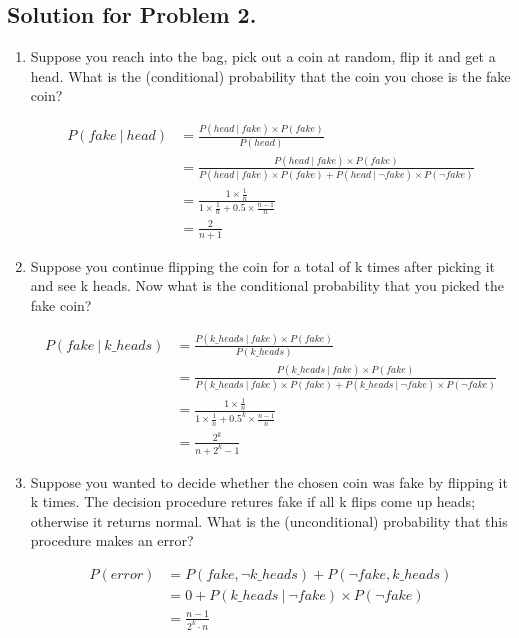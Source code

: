 \documentclass[notitlepage]{article}
\begin{document}
\subsection*{Solution for Problem 2.}
\begin{enumerate}
\item Suppose you reach into the bag, pick out a coin at random, flip it and get a head. What is the
(conditional) probability that the coin you chose is the fake coin?

\begin{align*}
P(\mathit{fake}~|~\mathit{head}) &= \frac{P(\mathit{head}~|~\mathit{fake})\times P(\mathit{fake})}{P(\mathit{head})}\\
&= \frac{P(\mathit{head}~|~\mathit{fake})\times P(\mathit{fake})}{P(\mathit{head}~|~\mathit{fake})\times P(\mathit{fake}) + P(\mathit{head}~|~\neg\mathit{fake})\times P(\neg\mathit{fake})}\\
&=\frac{1\times \frac{1}{n}}{1 \times \frac{1}{n} + 0.5 \times \frac{n-1}{n}}\\
&=\frac{2}{n+1}
\end{align*} 

\item Suppose you continue flipping the coin for a total of k times after picking it and see k heads. Now what is the conditional probability that you picked the fake coin?

\begin{align*}
P(\mathit{fake}~|~\mathit{k\_heads}) &= \frac{P(\mathit{k\_heads}~|~\mathit{fake})\times P(\mathit{fake})}{P(\mathit{k\_heads})}\\
&= \frac{P(\mathit{k\_heads}~|~\mathit{fake})\times P(\mathit{fake})}{P(\mathit{k\_heads}~|~\mathit{fake})\times P(\mathit{fake}) + P(\mathit{k\_heads}~|~\neg\mathit{fake})\times P(\neg\mathit{fake})}\\
&=\frac{1\times \frac{1}{n}}{1 \times \frac{1}{n} + 0.5^{k} \times \frac{n-1}{n}}\\
&=\frac{2^k}{n+2^k-1}
\end{align*} 

\item Suppose you wanted to decide whether the chosen coin was fake by flipping it k times. The
decision procedure retures fake if all k flips come up heads; otherwise it returns normal. What is
the (unconditional) probability that this procedure makes an error?

\begin{align*}
P(\mathit{error}) &= P(\mathit{fake},\neg\mathit{k\_heads}) + P(\neg\mathit{fake},\mathit{k\_heads})\\
&=0 + P(\mathit{k\_heads}~|~\neg\mathit{fake})\times P(\neg\mathit{fake})\\
&= \frac{n-1}{2^k\cdot n}
\end{align*}
\end{enumerate}
\end{document}
